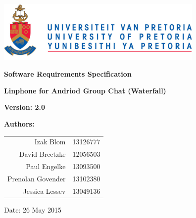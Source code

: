 \begin{titlepage}
\begin{flushright}

\includegraphics[width=380px]{./images/University_of_Pretoria_Logo.png}
\newline
\newline

\textbf {\LARGE Software Requirements Specification} \newline

\textbf {\Large Linphone for Andriod Group Chat (Waterfall)}\newline

\textbf {\large Version: 2.0}\newline

\centering \textbf {\large Authors:}

\begin{table}[H]
\large
\centering
\begin{tabular}{rl}
	Izak Blom & 13126777 \\
	David Breetzke & 12056503 \\
	Paul Engelke & 13093500 \\
	Prenolan Govender & 13102380 \\
	Jessica Lessev & 13049136 \\
\end{tabular}
\end{table}

Date: 26 May 2015

\end{flushright}
\end{titlepage}